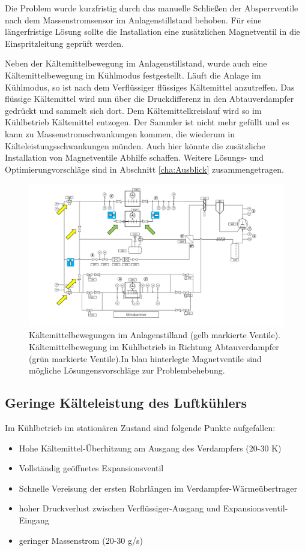 Die Problem wurde kurzfristig durch das manuelle Schließen der Absperrventile nach dem Massenstromsensor im Anlagenstillstand behoben. Für eine längerfristige Lösung sollte die Installation eine zusätzlichen Magnetventil in die Einspritzleitung geprüft werden. 

Neben der Kältemittelbewegung im Anlagenstillstand, wurde auch eine Kältemittelbewegung im Kühlmodus festgestellt. Läuft die Anlage im Kühlmodus, so ist nach dem Verflüssiger flüssiges Kältemittel anzutreffen. Das flüssige Kältemittel wird nun über die Druckdifferenz in den Abtauverdampfer gedrückt und sammelt sich dort. Dem Kältemittelkreislauf wird so im Kühlbetrieb Kältemittel entzogen. Der Sammler ist nicht mehr gefüllt und es kann zu Massenstromschwankungen kommen, die wiederum in Kälteleistungsschwankungen münden. 
 Auch hier könnte die zusätzliche Installation von Magnetventile Abhilfe schaffen. Weitere Lösungs- und Optimierungvorschläge sind in Abschnitt \ref{cha:Ausblick} zusammengetragen.  


\begin{figure}[htb]
\centering	
	\includegraphics[page=1,width=1.150\textwidth]{Pictures/Inbetriebnahme/Probleme.pdf}
\caption{Kältemittelbewegungen im Anlagenstilland (gelb markierte Ventile). Kältemittelbewegung im Kühlbetrieb in Richtung Abtauverdampfer (grün markierte Ventile).In blau hinterlegte Magnetventile sind mögliche Lösungensvorschläge zur Problembehebung.}
\label{fig:Problem1}
\end{figure}


\subsection*{Geringe Kälteleistung des Luftkühlers}

Im Kühlbetrieb im stationären Zustand sind folgende Punkte aufgefallen: 
\begin{itemize}
\item Hohe Kältemittel-Überhitzung am Ausgang des Verdampfers (20-30 K)
\item Vollständig geöffnetes Expansionsventil
\item Schnelle Vereisung der ersten Rohrlängen im Verdampfer-Wärmeübertrager
\item hoher Druckverlust zwischen Verflüssiger-Ausgang und Expansionsventil-Eingang
\item geringer Massenstrom (20-30 g/s)
\end{itemize}


